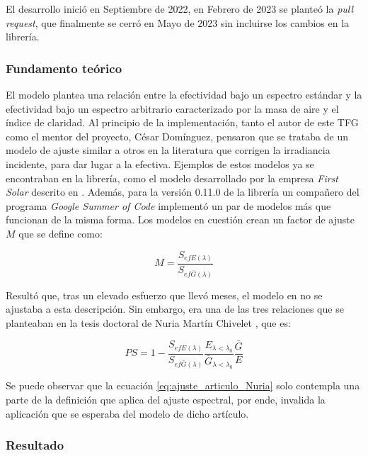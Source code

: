 El desarrollo inició en Septiembre de 2022, en Febrero de 2023 se planteó la \textit{pull request}, que finalmente se cerró en Mayo de 2023 sin incluirse los cambios en la librería.

\subsubsection{Fundamento teórico}

El modelo \cite{Martín_Ruiz_1999} plantea una relación entre la efectividad bajo un espectro estándar y la efectividad bajo un espectro arbitrario caracterizado por la masa de aire y el índice de claridad. Al principio de la implementación, tanto el autor de este TFG como el mentor del proyecto, César Domínguez, pensaron que se trataba de un modelo de ajuste similar a otros en la literatura que corrigen la irradiancia incidente, para dar lugar a la efectiva. Ejemplos de estos modelos ya se encontraban en la librería, como el modelo desarrollado por la empresa \textit{First Solar} descrito en \cite{Lee_Panchula_2016}. Además, para la versión 0.11.0 de la librería un compañero del programa \textit{Google Summer of Code} implementó un par de modelos más que funcionan de la misma forma. Los modelos en cuestión crean un factor de ajuste $M$ que se define como:

\begin{equation} \label{eq:ajuste_articulo_Nuria}
    M = \frac{S_{efE(\lambda)}}{S_{ef\bar{G}(\lambda)}}
\end{equation}

Resultó que, tras un elevado esfuerzo que llevó meses, el modelo en \cite{Martín_Chivelet_1999} no se ajustaba a esta descripción. Sin embargo, era una de las tres relaciones que se planteaban en la tesis doctoral de Nuria Martín Chivelet \cite{Martín_Chivelet_1999}, que es:

\begin{equation}
    PS = 1 - \frac{S_{efE(\lambda)}}{S_{ef\bar{G}(\lambda)}}\frac{E_{\lambda<\lambda_0}}{\bar{G}_{\lambda<\lambda_0}}\frac{\bar{G}}{E}
\end{equation}

Se puede observar que la ecuación \ref{eq:ajuste_articulo_Nuria} solo contempla una parte de la definición que aplica del ajuste espectral, por ende, invalida la aplicación que se esperaba del modelo de dicho artículo.

\subsubsection{Resultado}

